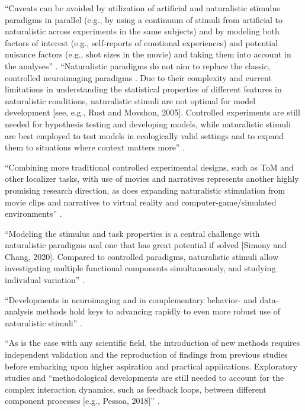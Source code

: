 %
``Caveats can be avoided by utilization of artificial and naturalistic stimulus
paradigms in parallel (e.g., by using a continuum of stimuli from artificial to
naturalistic across experiments in the same subjects) and by modeling both
factors of interest (e.g., self-reports of emotional experiences) and potential
nuisance factors (e.g., shot sizes in the movie) and taking them into account in
the analyses'' \citep{jaaskelainen2021movies}.
%
``Naturalistic paradigms do not aim to replace the classic, controlled
neuroimaging paradigms \citep{sonkusare2019naturalistic}.
%
Due to their complexity and current limitations in understanding the statistical
properties of different features in naturalistic conditions, naturalistic
stimuli are not optimal for model development [see, e.g., Rust and Movshon,
2005].
%
Controlled experiments are still needed for hypothesis testing and developing
models, while naturalistic stimuli are best employed to test models in
ecologically valid settings and to expand them to situations where context
matters more'' \citep[][p. 19]{saarimaki2021naturalistic}.

%
``Combining more traditional controlled experimental designs, such as ToM and
other localizer tasks, with use of movies and narratives represents another
highly promising research direction, as does expanding naturalistic stimulation
from movie clips and narratives to virtual reality and computer-game/simulated
environments'' \citep{jaaskelainen2021movies}.


%
``Modeling the stimulus and task properties is a central challenge with
naturalistic paradigms and one that has great potential if solved [Simony and
Chang, 2020].
%
Compared to controlled paradigms, naturalistic stimuli allow investigating
multiple functional components simultaneously, and studying individual
variation'' \citep{saarimaki2021naturalistic}.

%
``Developments in neuroimaging and in complementary behavior- and data-analysis
methods hold keys to advancing rapidly to even more robust use of naturalistic
stimuli'' \citep{jaaskelainen2021movies}.


%
``As is the case with any scientific field, the introduction of new
methods requires independent validation and the reproduction of findings from
previous studies before embarking upon higher aspiration and practical
applications.
%
Exploratory studies and ``methodological developments are still needed to
account for the complex interaction dynamics, such as feedback loops, between
different component processes [e.g., Pessoa, 2018]''
\citep{saarimaki2021naturalistic}.


